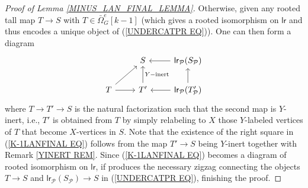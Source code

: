 \documentclass[a4paper,10pt]{article}%
\begin{document}
\begin{proof}[Proof of Lemma \ref{MINUS_LAN_FINAL_LEMMA}]
  
Otherwise, given any rooted tall map $T \to S$ with 
$T \in \bar{\Omega}_G^e[k-1]$ (which gives a rooted isomorphism on $\mathsf{lr}$ and thus encodes a unique object of (\ref{UNDERCATPR EQ})). One can then form a diagram
\begin{equation}\label{K-1LANFINAL EQ}
\begin{tikzcd}
	      & S & \mathsf{lr}_{\mathcal{P}}(S_{\mathcal{P}}) \ar{l}
\\
	T \ar{ur} \ar{r} & T' \ar{u}[swap]{Y-\text{inert}} & \mathsf{lr}_{\mathcal{P}}(T'_{\mathcal{P}}) \ar{l} \ar{u}
\end{tikzcd}
\end{equation}
where $T \to T' \to S$ is the natural factorization such that the second map is $Y$-inert, i.e., $T'$ is obtained from $T$ by simply relabeling to $X$ those $Y$-labeled vertices of $T$ that become $X$-vertices in $S$. Note that the existence of the right square in (\ref{K-1LANFINAL EQ}) follows from the map $T' \to S$ being $Y$-inert together with Remark \ref{YINERT REM}.
Since (\ref{K-1LANFINAL EQ}) becomes a diagram of rooted  isomorphism on $\mathsf{lr}$, if produces the necessary zigzag connecting the objects $T \to S$ and 
$\mathsf{lr}_{\mathcal{P}}(S_{\mathcal{P}}) \to S$
in (\ref{UNDERCATPR EQ}), finishing the proof.
%
%

\end{proof}
\end{document}
